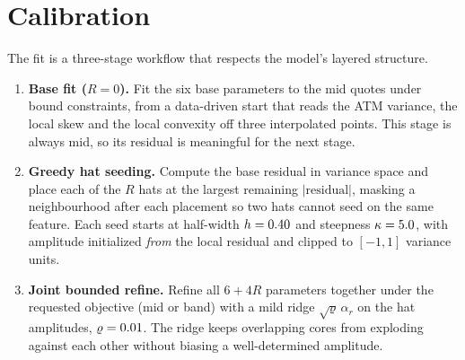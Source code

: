 \documentclass[11pt]{article}
\begin{document}
\section{Calibration}
\label{sec:calib}

The fit is a three-stage workflow that respects the model's layered structure.

\begin{enumerate}[leftmargin=1.6em]
\item \textbf{Base fit ($R=0$).} Fit the six base parameters to the mid quotes
under bound constraints, from a data-driven start that reads the ATM variance,
the local skew and the local convexity off three interpolated points. This stage
is always mid, so its residual is meaningful for the next stage.
\item \textbf{Greedy hat seeding.} Compute the base residual in variance space and
place each of the $R$ hats at the largest remaining $|{\text{residual}}|$,
masking a neighbourhood after each placement so two hats cannot seed on the
same feature. Each seed starts at half-width $h=0.40$ and steepness
$\kappa=5.0$, with amplitude initialized \emph{from} the local
residual and clipped to $[-1,1]$ variance units.
\item \textbf{Joint bounded refine.} Refine all $6+4R$ parameters together under
the requested objective (mid or band) with a mild ridge $\sqrt{\varrho}\,\alpha_r$
on the hat amplitudes, $\varrho=0.01$. The ridge keeps overlapping cores from
exploding against each other without biasing a well-determined amplitude.
\end{enumerate}
\end{document}
